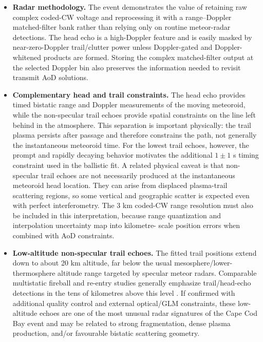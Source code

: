 \begin{itemize}
  \item \textbf{Radar methodology.}  The event demonstrates the value of
  retaining raw complex coded-CW voltage and reprocessing it with a
  range--Doppler matched-filter bank rather than relying only on routine
  meteor-radar detections.  The head echo is a high-Doppler feature and is
  easily masked by near-zero-Doppler trail/clutter power unless Doppler-gated
  and Doppler-whitened products are formed.  Storing the complex matched-filter
  output at the selected Doppler bin also preserves the information needed to
  revisit transmit AoD solutions.

  \item \textbf{Complementary head and trail constraints.}  The head echo
  provides timed bistatic range and Doppler measurements of the moving
  meteoroid, while the non-specular trail echoes provide spatial constraints
  on the line left behind in the atmosphere.  This separation is important
  physically: the trail plasma persists after passage and therefore constrains
  the path, not generally the instantaneous meteoroid time.  For the lowest
  trail echoes, however, the prompt and rapidly decaying behavior motivates the
  additional \(1\pm1\) s timing constraint used in the ballistic fit.
  A related physical caveat is that non-specular trail echoes are not
  necessarily produced at the instantaneous meteoroid head location.  They can
  arise from displaced plasma-trail scattering regions, so some vertical and
  geographic scatter is expected even with perfect interferometry.  The
  3 km coded-CW range resolution must also be included in this interpretation,
  because range quantization and interpolation uncertainty map into kilometre-
  scale position errors when combined with AoD constraints.

  \item \textbf{Low-altitude non-specular trail echoes.}  The fitted trail
  positions extend down to about 20 km altitude, far below the usual
  mesosphere/lower-thermosphere altitude range targeted by specular meteor
  radars.  Comparable multistatic fireball and re-entry studies generally
  emphasize trail/head-echo detections in the tens of kilometres above this
  level \cite{vierinen_2022_pajala,obenberger2026first,
  vierinen_2026_falcon9}.  If confirmed with additional quality control and
  external optical/GLM constraints, these low-altitude echoes are one of the
  most unusual radar signatures of the Cape Cod Bay event and may be related to
  strong fragmentation, dense plasma production, and/or favourable bistatic
  scattering geometry.


\end{itemize}
